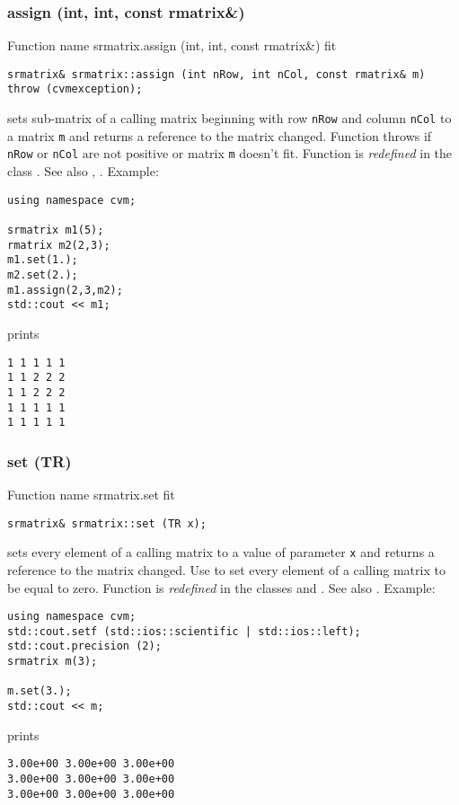 \subsubsection{assign (int, int, const rmatrix\&)}
Function%
\pdfdest name {srmatrix.assign (int, int, const rmatrix&)} fit
\begin{verbatim}
srmatrix& srmatrix::assign (int nRow, int nCol, const rmatrix& m)
throw (cvmexception);
\end{verbatim}
sets sub-matrix of a calling matrix beginning with \Based row
\verb"nRow" and column \verb"nCol" to a matrix \verb"m" and
returns a reference to the matrix changed. Function throws 
  if \verb"nRow"
or \verb"nCol" are not positive or matrix \verb"m" doesn't fit.
Function is \emph{redefined} in the class
.
See also , .
Example:
\begin{Verbatim}
using namespace cvm;

srmatrix m1(5);
rmatrix m2(2,3);
m1.set(1.);
m2.set(2.);
m1.assign(2,3,m2);
std::cout << m1;
\end{Verbatim}
prints
\begin{Verbatim}
1 1 1 1 1
1 1 2 2 2
1 1 2 2 2
1 1 1 1 1
1 1 1 1 1
\end{Verbatim}
\newpage





\subsubsection{set (TR)}
Function%
\pdfdest name {srmatrix.set} fit
\begin{verbatim}
srmatrix& srmatrix::set (TR x);
\end{verbatim}
sets every element of a calling matrix to a value of
parameter \verb"x" and returns a reference to
the matrix changed.
Use  to set every element
of a calling matrix to be equal to zero.
Function is \emph{redefined} in the classes
and .
See also .
Example:
\begin{Verbatim}
using namespace cvm;
std::cout.setf (std::ios::scientific | std::ios::left); 
std::cout.precision (2);
srmatrix m(3);

m.set(3.);
std::cout << m;
\end{Verbatim}
prints
\begin{Verbatim}
3.00e+00 3.00e+00 3.00e+00
3.00e+00 3.00e+00 3.00e+00
3.00e+00 3.00e+00 3.00e+00
\end{Verbatim}
\newpage



